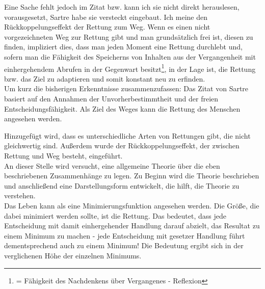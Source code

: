 \documentclass[12pt,a4paper,oneside]{article}
\begin{document}
  Eine Sache fehlt jedoch im Zitat bzw. kann ich sie nicht direkt herauslesen, vorausgesetzt, Sartre habe sie versteckt eingebaut. Ich meine den Rückkoppelungseffekt der Rettung zum Weg. Wenn es einen nicht vorgezeichneten Weg zur Rettung gibt und man grundsätzlich frei ist, diesen zu finden, impliziert dies, dass man jeden Moment eine Rettung durchlebt und, sofern man die Fähigkeit des Speicherns von Inhalten aus der Vergangenheit mit einhergehendem Abrufen in der Gegenwart besitzt\footnote{= Fähigkeit des Nachdenkens über Vergangenes - Reflexion}, in der Lage ist, die Rettung bzw. das Ziel zu adaptieren und somit konstant neu zu erfinden. \\
  
  Um kurz die bisherigen Erkenntnisse zusammenzufassen: Das Zitat von Sartre basiert auf den Annahmen der Unvorherbestimmtheit und der freien Entscheidungsfähigkeit. Als Ziel des Weges kann die Rettung des Menschen angesehen werden. 
  
  Hinzugefügt wird, dass es unterschiedliche Arten von Rettungen gibt, die nicht gleichwertig sind. Außerdem wurde der Rückkoppelungseffekt, der zwischen Rettung und Weg besteht, eingeführt. \\
  
  An dieser Stelle wird versucht, eine allgemeine Theorie über die eben beschriebenen Zusammenhänge zu legen. Zu Beginn wird die Theorie beschrieben und anschließend eine Darstellungsform entwickelt, die hilft, die Theorie zu verstehen. \\
  
  
  
  
  Das Leben kann als eine Minimierungsfunktion angesehen werden. Die Größe, die dabei minimiert werden sollte, ist die Rettung. Das bedeutet, dass jede Entscheidung mit damit einhergehender Handlung darauf abzielt, das Resultat zu einem Minimum zu machen - jede Entscheidung mit gesetzer Handlung führt dementsprechend auch zu einem Minimum! Die Bedeutung ergibt sich in der verglichenen Höhe der einzelnen Minimums. 
  
\end{document}
